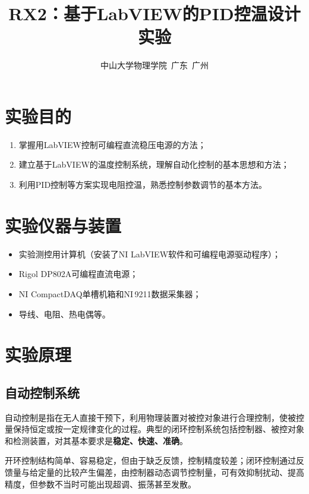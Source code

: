 \documentclass[a4paper,8pt,twocolumn]{article}
\title{
  \textbf{\huge RX2：基于LabVIEW的PID控温设计实验}
}
\author{
  \small 中山大学物理学院~广东~广州
}
\begin{document}
\maketitle
\newpage

\section{实验目的}

\begin{enumerate}
  \item 掌握用LabVIEW控制可编程直流稳压电源的方法；
  \item 建立基于LabVIEW的温度控制系统，理解自动化控制的基本思想和方法；
  \item 利用PID控制等方案实现电阻控温，熟悉控制参数调节的基本方法。
\end{enumerate}

\section{实验仪器与装置}

\begin{itemize}
  \item 实验测控用计算机（安装了NI LabVIEW软件和可编程电源驱动程序）；
  \item Rigol DP802A可编程直流电源；
  \item NI CompactDAQ单槽机箱和NI\,9211数据采集器；
  \item 导线、电阻、热电偶等。
\end{itemize}

\section{实验原理}

\subsection{自动控制系统}

自动控制是指在无人直接干预下，利用物理装置对被控对象进行合理控制，使被控量保持恒定或按一定规律变化的过程。典型的闭环控制系统包括控制器、被控对象和检测装置，对其基本要求是\textbf{稳定、快速、准确}。

开环控制结构简单、容易稳定，但由于缺乏反馈，控制精度较差；闭环控制通过反馈量与给定量的比较产生偏差，由控制器动态调节控制量，可有效抑制扰动、提高精度，但参数不当时可能出现超调、振荡甚至发散。
\end{document}
